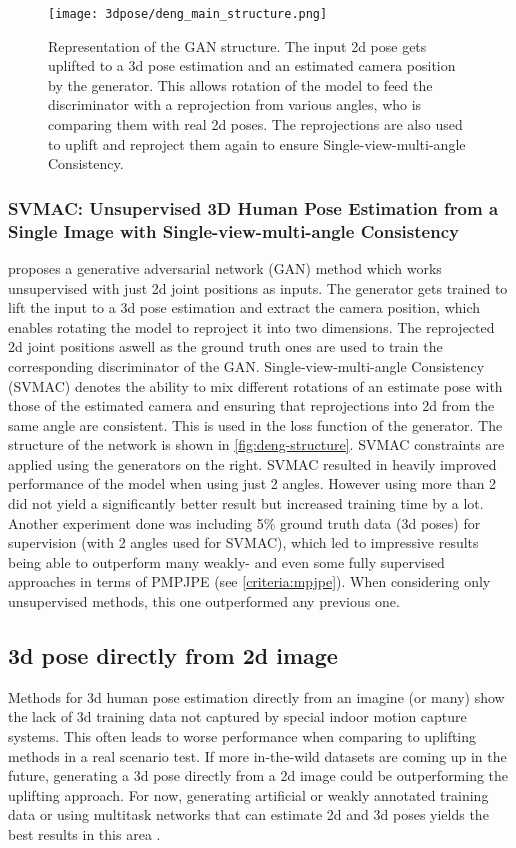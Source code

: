 \begin{figure*}[!htb]
 	\centering
 	\texttt{[image: 3dpose/deng\_main\_structure.png]}
 	\caption{Representation of the GAN structure. The input 2d pose gets uplifted to a 3d pose estimation and an estimated camera position by the generator. This allows rotation of the model to feed the discriminator with a reprojection from various angles, who is comparing them with real 2d poses. The reprojections are also used to uplift and reproject them again to ensure Single-view-multi-angle Consistency. \cite{Deng2021}}
 	\label{fig:deng-structure}
\end{figure*}
 
\subsubsection{SVMAC: Unsupervised 3D Human Pose Estimation from a Single Image with Single-view-multi-angle Consistency}
\cite{Deng2021} proposes a generative adversarial network (GAN) method which works unsupervised with just 2d joint positions as inputs. The generator gets trained to lift the input to a 3d pose estimation and extract the camera position, which enables rotating the model to reproject it into two dimensions. The reprojected 2d joint positions aswell as the ground truth ones are used to train the corresponding discriminator of the GAN. Single-view-multi-angle Consistency (SVMAC) denotes the ability to mix different rotations of an estimate pose with those of the estimated camera and ensuring that reprojections into 2d from the same angle are consistent. This is used in the loss function of the generator.
The structure of the network is shown in \autoref{fig:deng-structure}. SVMAC constraints are applied using the generators on the right.
SVMAC resulted in heavily improved performance of the model when using just 2 angles. However using more than 2 did not yield a significantly better result but increased training time by a lot.
Another experiment done was including 5\% ground truth data (3d poses) for supervision (with 2 angles used for SVMAC), which led to impressive results being able to outperform many weakly- and even some fully supervised approaches in terms of PMPJPE (see \autoref{criteria:mpjpe}). When considering only unsupervised methods, this one outperformed any previous one.
 
\subsection{3d pose directly from 2d image}
Methods for 3d human pose estimation directly from an imagine (or many) show the lack of 3d training data not captured by special indoor motion capture systems. This often leads to worse performance when comparing to uplifting methods in a real scenario test. If more in-the-wild datasets are coming up in the future, generating a 3d pose directly from a 2d image could be outperforming the uplifting approach. For now, generating artificial or weakly annotated training data or using multitask networks that can estimate 2d and 3d poses yields the best results in this area \cite{wang_deep_2021}.

